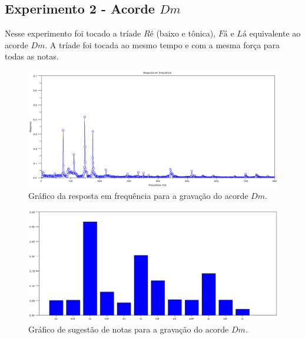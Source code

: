 \subsection{Experimento 2 - Acorde $Dm$}
\label{sec:experimento2}

Nesse experimento foi tocado a tríade $Ré$ (baixo e tônica), $Fá$ e $Lá$ equivalente ao acorde $Dm$. A tríade foi tocada ao mesmo tempo e com a mesma força para todas as notas.

\begin{figure}[h]
	\centering
		\includegraphics[keepaspectratio=true,scale=0.49]{figuras/Dm/fft_Dm.eps}
	\caption{Gráfico da resposta em frequência para a gravação do acorde $Dm$.}
  \label{fig:espectro_Dm}
\end{figure}

\begin{figure}[h]
	\centering
		\includegraphics[keepaspectratio=true,scale=0.49]{figuras/Dm/notas_Dm.eps}
	\caption{Gráfico de sugestão de notas para a gravação do acorde $Dm$.}
  \label{fig:notas_Dm}
\end{figure}


